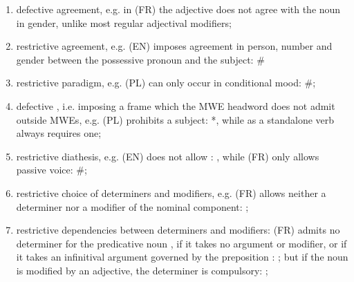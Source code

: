 \documentclass[output=paper
,modfonts
,nonflat
,biblatexbackend=biber
]{langsci/langscibook}
\begin{document}
\begin{enumerate}
\item\label{lic:def-agr} defective agreement, e.g. in (FR)  the adjective does not agree with the noun in gender, unlike most regular adjectival modifiers;
\item\label{lic:restr-agr} restrictive agreement, e.g. (EN)  imposes agreement in person, number and gender between the possessive pronoun and the subject: \#
\item\label{lic:restr-par} restrictive paradigm, e.g. (PL)  can only occur in conditional mood: \#;
\item\label{lic:def-subcat} defective , i.e. imposing a  frame which the MWE headword does not admit outside MWEs, e.g. (PL)  prohibits a subject: *, while  as a standalone verb always requires one; 
\item\label{lic:restr-dia} restrictive diathesis, e.g. (EN)  does not allow : , while (FR)  only allows passive voice: \#;
\item\label{lic:restr-det-mod} restrictive choice of determiners and modifiers, e.g. (FR)  allows neither a determiner nor a  modifier of the nominal component: ;
\item\label{lic:restr-det-mod-comb} restrictive dependencies  between determiners and modifiers: (FR)  admits no determiner for the predicative noun , if it takes no argument or modifier, or if it takes an infinitival argument governed by the preposition : ; but if the noun is modified by an adjective, the determiner is compulsory: ;

\end{enumerate}
\end{document}
